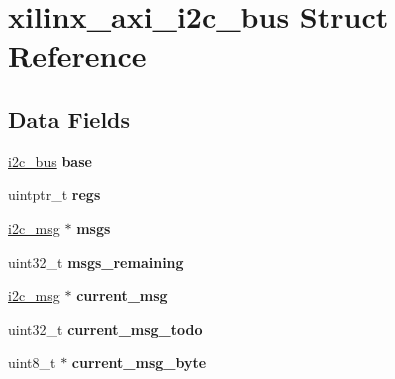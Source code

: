 \hypertarget{structxilinx__axi__i2c__bus}{}\section{xilinx\+\_\+axi\+\_\+i2c\+\_\+bus Struct Reference}
\label{structxilinx__axi__i2c__bus}
\subsection*{Data Fields}
\begin{DoxyCompactItemize}
\item 
\mbox{\label{structxilinx__axi__i2c__bus_af3d802fcdb5f88706eb74a33a89e45df}} 
\mbox{\hyperlink{structi2c__bus}{i2c\+\_\+bus}} {\bfseries base}
\item 
\mbox{\label{structxilinx__axi__i2c__bus_a765b3754732e9c88ace94b71fc2e4189}} 
uintptr\+\_\+t {\bfseries regs}
\item 
\mbox{\label{structxilinx__axi__i2c__bus_af49398afef8662b56edbc00c00706efa}} 
\mbox{\hyperlink{structi2c__msg}{i2c\+\_\+msg}} $\ast$ {\bfseries msgs}
\item 
\mbox{\label{structxilinx__axi__i2c__bus_a3ffd1dd4bbf59f0ddf2e44610a75445d}} 
uint32\+\_\+t {\bfseries msgs\+\_\+remaining}
\item 
\mbox{\label{structxilinx__axi__i2c__bus_ab676378bebf787047c329b069b09dc22}} 
\mbox{\hyperlink{structi2c__msg}{i2c\+\_\+msg}} $\ast$ {\bfseries current\+\_\+msg}
\item 
\mbox{\label{structxilinx__axi__i2c__bus_ad0f3dac6df4e2a510f1cae1e00eb4f9b}} 
uint32\+\_\+t {\bfseries current\+\_\+msg\+\_\+todo}
\item 
\mbox{\label{structxilinx__axi__i2c__bus_ad0eb4d07fc4a9b7177b8ed672d3437b3}} 
uint8\+\_\+t $\ast$ {\bfseries current\+\_\+msg\+\_\+byte}
\item 
\mbox{\label{structxilinx__axi__i2c__bus_a3f221326310a9051669947f295acdfa9}} 

\end{DoxyCompactItemize}
